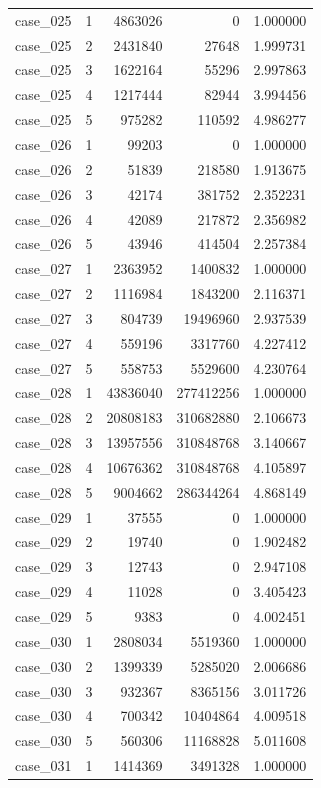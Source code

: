 \begin{longtable}{lrrrr}
case\_025 & 1 & 4863026 & 0 & 1.000000 \\
case\_025 & 2 & 2431840 & 27648 & 1.999731 \\
case\_025 & 3 & 1622164 & 55296 & 2.997863 \\
case\_025 & 4 & 1217444 & 82944 & 3.994456 \\
case\_025 & 5 & 975282 & 110592 & 4.986277 \\
case\_026 & 1 & 99203 & 0 & 1.000000 \\
case\_026 & 2 & 51839 & 218580 & 1.913675 \\
case\_026 & 3 & 42174 & 381752 & 2.352231 \\
case\_026 & 4 & 42089 & 217872 & 2.356982 \\
case\_026 & 5 & 43946 & 414504 & 2.257384 \\
case\_027 & 1 & 2363952 & 1400832 & 1.000000 \\
case\_027 & 2 & 1116984 & 1843200 & 2.116371 \\
case\_027 & 3 & 804739 & 19496960 & 2.937539 \\
case\_027 & 4 & 559196 & 3317760 & 4.227412 \\
case\_027 & 5 & 558753 & 5529600 & 4.230764 \\
case\_028 & 1 & 43836040 & 277412256 & 1.000000 \\
case\_028 & 2 & 20808183 & 310682880 & 2.106673 \\
case\_028 & 3 & 13957556 & 310848768 & 3.140667 \\
case\_028 & 4 & 10676362 & 310848768 & 4.105897 \\
case\_028 & 5 & 9004662 & 286344264 & 4.868149 \\
case\_029 & 1 & 37555 & 0 & 1.000000 \\
case\_029 & 2 & 19740 & 0 & 1.902482 \\
case\_029 & 3 & 12743 & 0 & 2.947108 \\
case\_029 & 4 & 11028 & 0 & 3.405423 \\
case\_029 & 5 & 9383 & 0 & 4.002451 \\
case\_030 & 1 & 2808034 & 5519360 & 1.000000 \\
case\_030 & 2 & 1399339 & 5285020 & 2.006686 \\
case\_030 & 3 & 932367 & 8365156 & 3.011726 \\
case\_030 & 4 & 700342 & 10404864 & 4.009518 \\
case\_030 & 5 & 560306 & 11168828 & 5.011608 \\
case\_031 & 1 & 1414369 & 3491328 & 1.000000 \\

\end{longtable}
